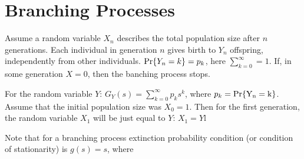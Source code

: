 \section{Branching Processes}

Assume a random variable $X_n$ describes the total population size  after $n$ generations. Each individual in generation $n$ gives birth to $Y_n$ offspring, independently from other individuals. ${\rm Pr} \{ Y_n = k \} = p_k$, here $\sum_{k=0}^\infty = 1$. If, in some generation $X=0$, then the banching process stops.

For the random variable $Y$: $G_{Y}(s) = \sum_{k=0}^{\infty} p_k s^k$, where $p_k = {\rm Pr \{Y_n = k\}}$. Assume that the initial population size was $X_0=1$. Then for the first generation, the random variable $X_1$ will be just equal to $Y$: $X_1 = Y$l

Note that for a branching process extinction probability condition (or condition of stationarity) is $g(s) = s$, where 